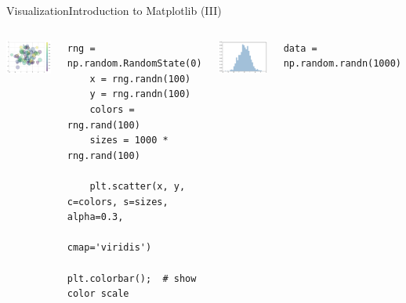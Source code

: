 \documentclass[10pt,compress]{beamer} %
\begin{document}
\begin{frame}[fragile]{Visualization}{Introduction to Matplotlib (III)}
	\begin{columns}
	\includegraphics[width=\textwidth]{figs/matplotlib-scatterplot2.png}\\

	\begin{exampleblock}{}
	\vspace{-0.2cm} 
	\begin{lstlisting}[basicstyle=\tiny]
	rng = np.random.RandomState(0)
	x = rng.randn(100)
	y = rng.randn(100)
	colors = rng.rand(100)
	sizes = 1000 * rng.rand(100)

	plt.scatter(x, y, c=colors, s=sizes, alpha=0.3,
	            cmap='viridis')
				plt.colorbar();  # show color scale
	\end{lstlisting}
	\vspace{-0.2cm} 
	\end{exampleblock}

	\centering \includegraphics[width=\textwidth]{figs/matplotlib-histogram.png}\\
	\begin{exampleblock}{}
	\vspace{-0.2cm} 
	\begin{lstlisting}[basicstyle=\tiny]
	data = np.random.randn(1000)


\end{lstlisting}
\end{exampleblock}
\end{columns}
\end{frame}
\end{document}
